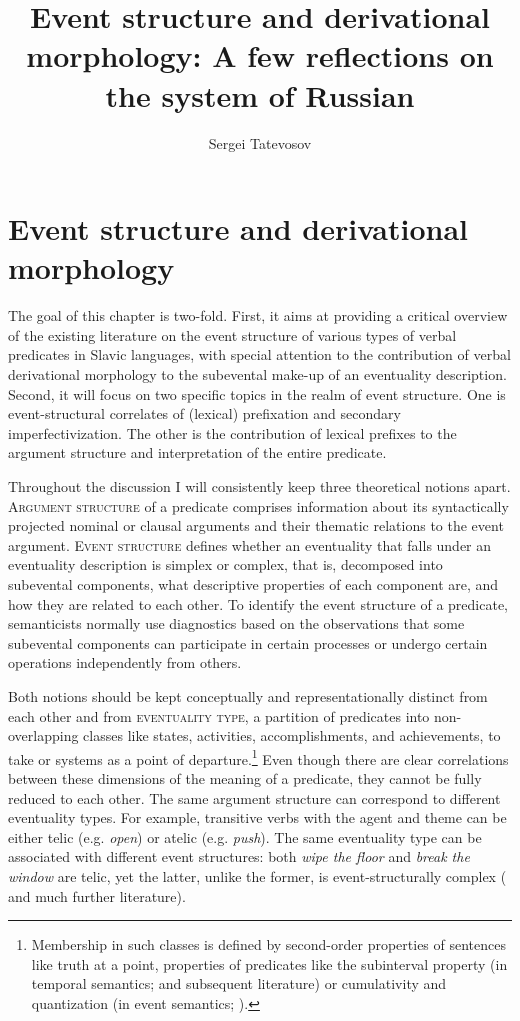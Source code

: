 \documentclass[output=paper,colorlinks,citecolor=brown]{langscibook}
\author{Sergei Tatevosov\orcid{0000-0002-1602-0116}\affiliation{Lomonosov Moscow State University}}
\title[Event structure and derivational morphology]{Event structure and derivational morphology: A few reflections on the system of Russian}
\begin{document}
\maketitle

\section{Event structure and derivational morphology}\label{sec:0}
\hypertarget{RefHeadingToc164647615}{}

The goal of this chapter is two-fold. First, it aims at providing a critical overview of the existing literature on the event structure of various types of verbal predicates in Slavic languages, with special attention to the contribution of verbal derivational morphology to the subevental make-up of an eventuality description. Second, it will focus on two specific topics in the realm of event structure. One is event-structural correlates of (lexical) prefixation and secondary imperfectivization. The other is the contribution of lexical prefixes to the argument structure and interpretation of the entire predicate. 

Throughout the discussion I will consistently keep three theoretical notions apart. \textsc{Argument structure} of a predicate comprises information about its  syntactically projected nominal or clausal arguments and their thematic relations to the event argument. \textsc{Event structure} defines whether an eventuality that falls under an eventuality description is simplex or complex, that is, decomposed into subevental components, what descriptive properties of each component are, and how they are related to each other. To identify the event structure of a predicate, semanticists normally use diagnostics based on the observations that some subevental components can participate in certain processes or undergo certain operations independently from others. 

Both notions should be kept conceptually and representationally distinct from each other and from \textsc{eventuality type}, a partition of predicates into non-over\-lap\-ping classes like states, activities, accomplishments, and achievements, to take  or  systems as a point of departure.\footnote{Membership in such classes is defined by second-order properties of sentences like truth at a point, properties of predicates like the subinterval property (in temporal semantics; \citealt{Bennett.Partee1972,Taylor1977} and subsequent literature) or cumulativity and quantization (in event semantics; \citealt{Krifka1989,Krifka1992,Krifka1998}).} Even though there are clear correlations between these dimensions of the meaning of a predicate, they cannot be fully reduced to each other. The same argument structure can correspond to different eventuality types. For example, transitive verbs with the agent and theme can be either telic (e.g. \textit{open}) or atelic (e.g. \textit{push}). The same eventuality type can be associated with different event structures: both \textit{wipe the floor} and \textit{break the window} are telic, yet the latter, unlike the former, is event-structurally complex (\citealt{Levin.RappaportHovav1995,Rappaport.Hovav.Levin1998} and much further literature).
\end{document}
